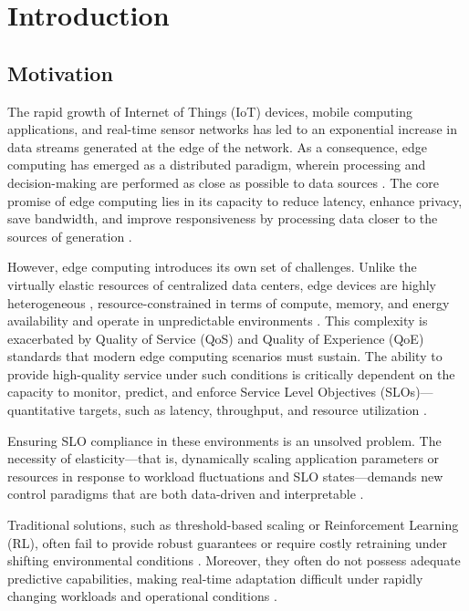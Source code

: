 \chapter{Introduction}

\section{Motivation}
The rapid growth of Internet of Things (IoT) devices, mobile computing applications, and real-time sensor networks has led to an exponential increase in data streams generated at the edge of the network. As a consequence, edge computing has emerged as a distributed paradigm, wherein processing and decision-making are performed as close as possible to data sources \cite{deng_edge_2020}. The core promise of edge computing lies in its capacity to
reduce latency, enhance privacy, save bandwidth, and improve responsiveness by processing data closer to the sources of generation \cite{deng_edge_2020}. 

However, edge computing introduces its own set of challenges. Unlike the virtually
elastic resources of centralized data centers, edge devices are highly heterogeneous \cite{furst_elastic_2018},
resource-constrained in terms of compute, memory, and energy availability and operate in unpredictable environments \cite{sedlak_active_2024, danilenka_adaptive_2025}. This complexity is exacerbated by Quality of Service (QoS) and Quality of Experience (QoE) standards that modern edge computing scenarios must sustain. The ability to provide high-quality service under such conditions is critically dependent on the capacity to monitor, predict, and enforce Service Level Objectives (SLOs)—quantitative targets, such as latency, throughput, and resource utilization \cite{sedlak_diffusing_2024, nastic_sloc_2020}. 

Ensuring SLO compliance in these environments is an unsolved problem. The necessity of elasticity—that is, dynamically scaling application parameters or resources in response to workload fluctuations and SLO states—demands new control paradigms that are both data-driven and interpretable \cite{lapkovskis_benchmarking_2025, dias_de_assuncao_distributed_2018}.

Traditional solutions, such as threshold-based scaling or Reinforcement Learning (RL), often fail to provide robust guarantees or require costly retraining under shifting environmental conditions \cite{xu_coscal_2022}. Moreover, they often do not possess adequate predictive capabilities, making real-time adaptation difficult under rapidly changing workloads and operational conditions \cite{oquinn_environment-aware_2025}.

